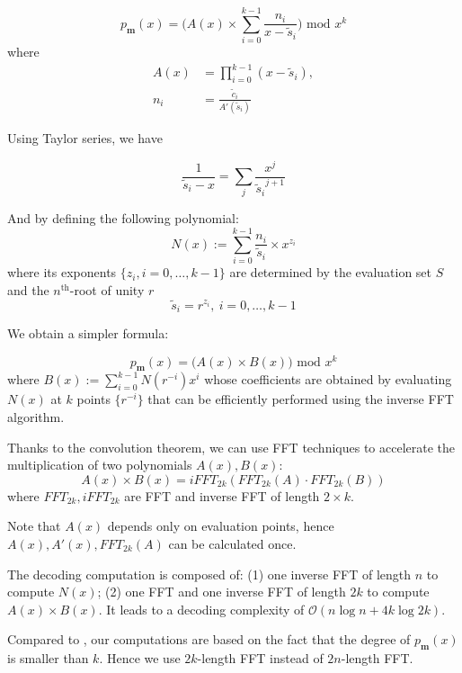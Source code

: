 \documentclass[oneside,9pt]{article}
\newcommand{\poly}[2]{ p_{\textbf{#1}}(#2) }
\newcommand{\bigo}[1]{ \mathcal{O}(#1) }
\newcommand{\ele}{s}
\newcommand{\ith}[1]{#1^\text{th}}
\begin{document}
\begin{equation}
\poly{m}{x} =  \Big( A(x) \times \sum_{i=0}^{k-1} \frac{n_i}{x -  \tilde{\ele}_i}  \Big) \text{ mod } x^k
\end{equation}
where
\[
\begin{split}
A(x) &= \prod_{i=0}^{k-1}(x -  \tilde{\ele}_i), \\
n_i &= \frac{ \tilde{c}_i }{ A'( \tilde{\ele}_i) }
\end{split}
\]

Using Taylor series, we have

\[
\frac{1}{ \tilde{\ele}_i - x } = \sum_j \frac{ x^j }{ {\tilde{\ele}_i}^{j+1} }
\]

And by defining the following polynomial:
\[
N(x) := \sum_{i = 0}^{k-1} \frac{n_i}{\tilde{\ele}_i} \times x^{z_i}
\]
where its exponents $\{z_i, i = 0, \dots, k-1 \}$ are determined by the evaluation set $S$ and the $\ith{n}$-root of unity $r$
\[
\tilde{\ele}_i = r^{z_i}, \ i = 0, \dots, k-1
\]
 
 We obtain a simpler formula:

\begin{equation}
\poly{m}{x} =  \Big( A(x) \times B(x) \Big) \text{ mod } x^k
\end{equation}
where $B(x) := \sum_{i=0}^{k-1} N(r^{-i}) x^i $ whose coefficients are obtained by evaluating $N(x)$ at $k$ points $\{ r^{-i} \}$ that can be efficiently performed using the inverse FFT algorithm.

Thanks to the convolution theorem, we can use FFT techniques to accelerate the multiplication of two polynomials $A(x), B(x)$:
\begin{equation}
A(x) \times B(x) = iFFT_{2k} ( FFT_{2k}(A) \cdot FFT_{2k}(B) )
\end{equation}
where $FFT_{2k},  iFFT_{2k}$ are FFT and inverse FFT of length $2 \times k$.

Note that $A(x)$ depends only on evaluation points, hence $A(x), A'(x), FFT_{2k}(A)$ can be calculated once.

The decoding computation is composed of:
(1) one inverse FFT of length $n$ to compute $N(x)$;
(2) one FFT and one inverse FFT of length $2k$ to compute $A(x) \times B(x)$.
It leads to a decoding complexity of $\bigo{ n \log n + 4 k \log{2k}}$.

Compared to \cite{fnt_lacan}, our computations are based on the fact that the degree of $\poly{m}{x}$ is smaller than $k$. Hence we use $2k$-length FFT instead of $2n$-length FFT.
\end{document}
